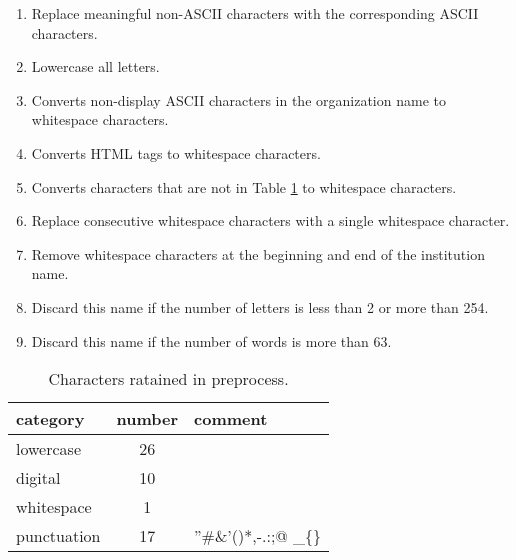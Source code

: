 \documentclass{article}
\begin{document}
\begin{enumerate}
    \item Replace meaningful non-ASCII characters with the corresponding ASCII characters.
    \item Lowercase all letters.
    \item Converts non-display ASCII characters in the organization name to whitespace characters.
    \item Converts HTML tags to whitespace characters.
    \item Converts characters that are not in Table \ref{tab:chars} to whitespace characters.
    \item Replace consecutive whitespace characters with a single whitespace character.
    \item Remove whitespace characters at the beginning and end of the institution name.
    \item Discard this name if the number of letters is less than 2 or more than 254.
    \item Discard this name if the number of words is more than 63.
\end{enumerate}




\begin{table}[h]
    \centering
    \begin{tabular}{l c l }
    \hline
    category&number& comment\\
    \hline
      lowercase  &  26  &  \\
        digital &  10  &  \\
      whitespace  &  1  &  \\
        punctuation &  17  &  ”\#\&’()*,-.:;@  \_\{\}\\
    \hline
    \end{tabular}
\caption{Characters ratained in preprocess.}
\label{tab:chars}
\end{table}
\end{document}
